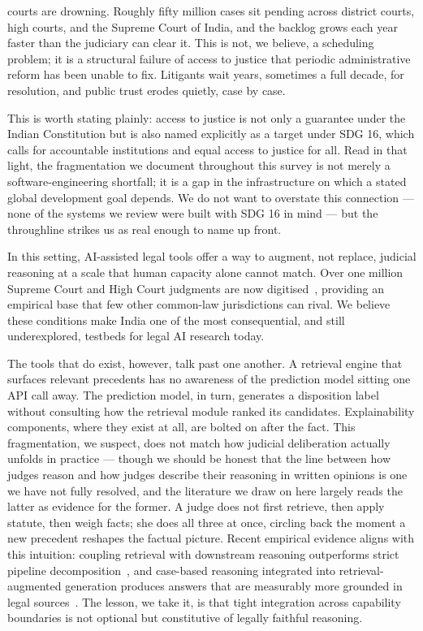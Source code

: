 courts are drowning. Roughly fifty million cases sit pending across district courts, high courts, and the Supreme Court of India, and the backlog grows each year faster than the judiciary can clear it. This is not, we believe, a scheduling problem; it is a structural failure of access to justice that periodic administrative reform has been unable to fix. Litigants wait years, sometimes a full decade, for resolution, and public trust erodes quietly, case by case.

This is worth stating plainly: access to justice is not only a guarantee under the Indian Constitution but is also named explicitly as a target under SDG 16, which calls for accountable institutions and equal access to justice for all. Read in that light, the fragmentation we document throughout this survey is not merely a software-engineering shortfall; it is a gap in the infrastructure on which a stated global development goal depends. We do not want to overstate this connection — none of the systems we review were built with SDG 16 in mind — but the throughline strikes us as real enough to name up front.

In this setting, AI-assisted legal tools offer a way to augment, not replace, judicial reasoning at a scale that human capacity alone cannot match. Over one million Supreme Court and High Court judgments are now digitised~\cite{nigam-etal-2025-nyayaanumana}, providing an empirical base that few other common-law jurisdictions can rival. We believe these conditions make India one of the most consequential, and still underexplored, testbeds for legal AI research today.

The tools that do exist, however, talk past one another. A retrieval engine that surfaces relevant precedents has no awareness of the prediction model sitting one API call away. The prediction model, in turn, generates a disposition label without consulting how the retrieval module ranked its candidates. Explainability components, where they exist at all, are bolted on after the fact. This fragmentation, we suspect, does not match how judicial deliberation actually unfolds in practice — though we should be honest that the line between how judges reason and how judges describe their reasoning in written opinions is one we have not fully resolved, and the literature we draw on here largely reads the latter as evidence for the former. A judge does not first retrieve, then apply statute, then weigh facts; she does all three at once, circling back the moment a new precedent reshapes the factual picture. Recent empirical evidence aligns with this intuition: coupling retrieval with downstream reasoning outperforms strict pipeline decomposition~\cite{nigam-etal-2025-nyayarag}, and case-based reasoning integrated into retrieval-augmented generation produces answers that are measurably more grounded in legal sources~\cite{wiratunga-etal-2024-cbrrag}. The lesson, we take it, is that tight integration across capability boundaries is not optional but constitutive of legally faithful reasoning.

